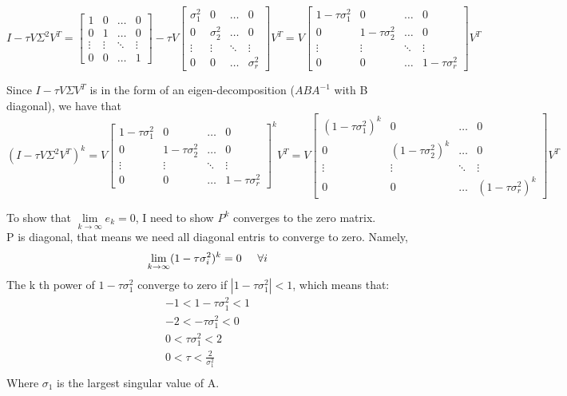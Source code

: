 \documentclass[paper=a4, fontsize=11pt]{scrartcl} %
\numberwithin{equation}{section} %
\numberwithin{figure}{section} %
\numberwithin{table}{section} %
\begin{document}
$$
I - \tau V \Sigma^2 V^T = 
\begin{bmatrix}
    1 & 0 & \dots  & 0 \\
    0 & 1 & \dots  & 0 \\
	\vdots & \vdots & \ddots & \vdots \\
    0 & 0 & \dots  & 1
\end{bmatrix} 
- \tau V
\begin{bmatrix}
    \sigma_{1}^2 & 0 & \dots  & 0 \\
    0 & \sigma_{2}^2 & \dots  & 0 \\
	\vdots & \vdots & \ddots & \vdots \\
	0 & 0 & \dots  & \sigma_{r}^2
\end{bmatrix} V^T 
= 
V
\begin{bmatrix}
    1- \tau \sigma_{1}^2 & 0 & \dots  & 0 \\
    0 & 1 - \tau \sigma_{2}^2 & \dots  & 0 \\
	\vdots & \vdots & \ddots & \vdots \\
	0 & 0 & \dots  & 1 - \tau \sigma_{r}^2
\end{bmatrix} V^T 
$$

Since $I - \tau V \Sigma V^T$ is in the form of an eigen-decomposition ($ABA^{-1}$ with B diagonal), we have that 
$$
(I - \tau V \Sigma^2 V^T)^k= 
V
\begin{bmatrix}
    1- \tau \sigma_{1}^2 & 0 & \dots  & 0 \\
    0 & 1 - \tau \sigma_{2}^2 & \dots  & 0 \\
	\vdots & \vdots & \ddots & \vdots \\
	0 & 0 & \dots  & 1 - \tau \sigma_{r}^2
\end{bmatrix}^k V^T 
= 
V
\begin{bmatrix}
    (1- \tau \sigma_{1}^2)^k & 0 & \dots  & 0 \\
    0 & (1 - \tau \sigma_{2}^2)^k & \dots  & 0 \\
	\vdots & \vdots & \ddots & \vdots \\
	0 & 0 & \dots  & (1 - \tau \sigma_{r}^2)^k
\end{bmatrix} V^T 
$$

To show that $ \underset{k \to \infty}{\lim} e_k = 0$, I need to show $P^k$ converges to the zero matrix.\\
P is diagonal, that means we need all diagonal entris to converge to zero. Namely, 
$$ \underset{k \to \infty}{\lim} (1 - \tau \sigma_{i}^2)^k = 0 \hspace{.5cm} \forall i $$ 
The k th power of $1 - \tau \sigma_{1}^2$ converge to zero if $|1 - \tau \sigma_{1}^2| < 1$, which means that: 
\begin{align*}
-1< 1 - \tau \sigma_{1}^2 < 1 	\\ 
-2<  - \tau \sigma_{1}^2 < 0 	\\ 
0<  \tau \sigma_{1}^2 < 2 	\\ 
0 < \tau  < \frac{2}{\sigma_{1}^2} \\ 
\end{align*}
Where $\sigma_{1} $ is the largest singular value of A. 
\end{document}
